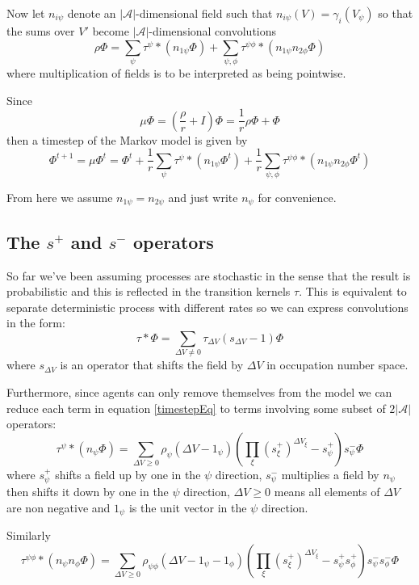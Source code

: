 \documentclass[a4paper]{article}
\begin{document}
Now let $n_{i\psi}$ denote an $|\mathcal{A}|$-dimensional field such that $n_{i\psi}(V) = \gamma_i(V_\psi)$ so that the sums over $V'$ become $|\mathcal{A}|$-dimensional convolutions
\begin{equation}
	\rho\Phi = 
	\sum_{\psi}\tau^\psi \ast (n_{1\psi}\Phi)
	+ \sum_{\psi,\phi}  \tau^{\psi\phi} \ast (n_{1\psi}n_{2\phi}\Phi)
\end{equation}
where multiplication of fields is to be interpreted as being pointwise.

Since
\[
\mu\Phi = \left(\frac{\rho}{r} + I\right)\Phi = \frac{1}{r} \rho\Phi + \Phi
\]
then a timestep of the Markov model is given by
\begin{equation}
\Phi^{t+1} = \mu\Phi^t = \Phi^t + 
\frac{1}{r}\sum_{\psi}\tau^\psi \ast (n_{1\psi}\Phi^t)
+ \frac{1}{r}\sum_{\psi,\phi}  \tau^{\psi\phi} \ast (n_{1\psi}n_{2\phi}\Phi^t)
\label{timestepEq}
\end{equation}

From here we assume $n_{1\psi} = n_{2\psi}$ and just write $n_\psi$ for convenience.

\subsection{The $s^+$ and $s^-$ operators}

So far we've been assuming processes are stochastic in the sense that the result is probabilistic and this is reflected in the transition kernels $\tau$. This is equivalent to separate deterministic process with different rates so we can express convolutions in the form:
\[
\tau \ast \Phi = \sum_{\Delta V \ne 0} \tau_{\Delta V}(s_{\Delta V} - 1)\Phi
\]
where $s_{\Delta V}$ is an operator that shifts the field by $\Delta V$ in occupation number space.

Furthermore, since agents can only remove themselves from the model we can reduce each term in equation \ref{timestepEq} to terms involving some subset of $2|\mathcal{A}|$ operators:
\[
\tau^\psi \ast (n_\psi\Phi) = 
\sum_{\Delta V \ge 0 }
\rho_\psi(\Delta V - 1_\psi)
\left(
\prod_{\xi} \left( s^+_\xi\right)^{\Delta V_\xi}  - s^+_\psi
\right)
s^-_\psi \Phi 
\]
where $s^+_\psi$ shifts a field up by one in the $\psi$ direction, $s^-_\psi$ multiplies a field by $n_\psi$ then shifts it down by one in the $\psi$ direction, $\Delta V \ge 0$ means all elements of $\Delta V$ are non negative and $1_\psi$ is the unit vector in the $\psi$ direction.

Similarly 
\[
\tau^{\psi\phi} \ast (n_\psi n_\phi \Phi) = 
\sum_{\Delta V \ge 0}
\rho_{\psi\phi}(\Delta V - 1_\psi - 1_\phi)
\left(
\prod_\xi \left(s^+_\xi\right)^{\Delta V_\xi} - s^+_\psi s^+_\phi
\right)
s^-_\psi s^-_\phi \Phi 
\]
\end{document}
